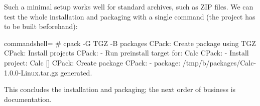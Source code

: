 Such a minimal setup works well for standard archives, such as ZIP files. We can test the whole installation and packaging with a single command (the project has to be built beforehand):

\begin{tcblisting}{commandshell={}}
# cpack -G TGZ -B packages
CPack: Create package using TGZ
CPack: Install projects
CPack: - Run preinstall target for: Calc
CPack: - Install project: Calc []
CPack: Create package
CPack: - package: /tmp/b/packages/Calc-1.0.0-Linux.tar.gz
generated.
\end{tcblisting}

This concludes the installation and packaging; the next order of business is documentation.










